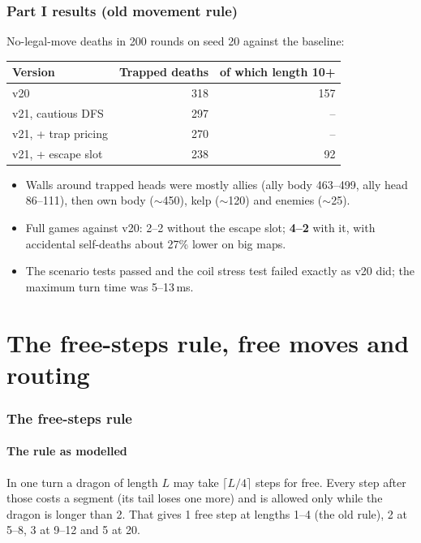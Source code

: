 \documentclass[11pt,a4paper]{article}
\begin{document}
\section{Part I results (old movement rule)}
No-legal-move deaths in 200 rounds on seed 20 against the baseline:
\begin{center}
      \begin{tabular}{@{}lrr@{}}
            \toprule
            Version             & Trapped deaths & of which length 10+ \\
            \midrule
            v20                 & 318            & 157                 \\
            v21, cautious DFS   & 297            & --                  \\
            v21, + trap pricing & 270            & --                  \\
            v21, + escape slot  & 238            & 92                  \\
            \bottomrule
      \end{tabular}
\end{center}
\begin{itemize}
      \item Walls around trapped heads were mostly allies (ally body 463--499, ally head 86--111), then own body ($\sim$450),
            kelp ($\sim$120) and enemies ($\sim$25).
      \item Full games against v20: 2--2 without the escape slot; \textbf{4--2} with it, with accidental self-deaths about
            27\% lower on big maps.
      \item The scenario tests passed and the coil stress test failed exactly as v20 did; the maximum turn time was 5--13\,ms.
\end{itemize}

\part{The free-steps rule, free moves and routing}
\section{The free-steps rule}\label{sec:rule}
\subsection{The rule as modelled}
In one turn a dragon of length $L$ may take $\lceil L/4\rceil$ steps for free. Every step after those costs a segment
(its tail loses one more) and is allowed only while the dragon is longer than 2. That gives 1 free step at lengths 1--4
(the old rule), 2 at 5--8, 3 at 9--12 and 5 at 20.
\end{document}

